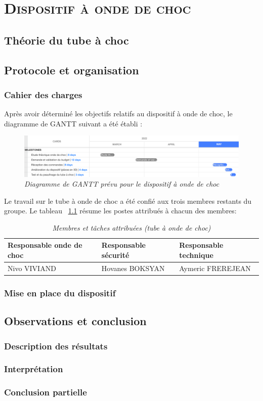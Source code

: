 \renewcommand{\chaptername}{\scshape Partie}
\chapter{\normalfont \scshape Dispositif à onde de choc}
\section{Théorie du tube à choc}
\section{Protocole et organisation}
\subsection{Cahier des charges}
Après avoir déterminé les objectifs relatifs au dispositif à onde de choc, le diagramme de GANTT suivant a été établi :
\begin{figure}[H]
	\includegraphics[scale = 0.4]{figures/gantt_choc.png}
	\caption{\small{\textit{Diagramme de GANTT prévu pour le dispositif à onde de choc}}}
	\label{gantt_choc}
\end{figure}
Le travail sur le tube à onde de choc a été confié aux trois membres restants du groupe. Le tableau ~\ref{gestion_choc} résume les postes attribués à chacun des membres:
\begin{table}[H]
	\centering
	\begin{tabular}{|l l l|}
		\hline
		\small\textbf{Responsable onde de choc}&\small\textbf{Responsable sécurité}&\small\textbf{Responsable technique}\\
		\hline
		Nivo VIVIAND&Hovanes BOKSYAN&Aymeric FREREJEAN\\
		\hline
	\end{tabular}
	\caption{\small\textit{Membres et tâches attribuées (tube à onde de choc)}}
	\label{gestion_choc}
\end{table}
\subsection{Mise en place du dispositif}
\section{Observations et conclusion}
\subsection{Description des résultats}
\subsection{Interprétation}
\subsection{Conclusion partielle}